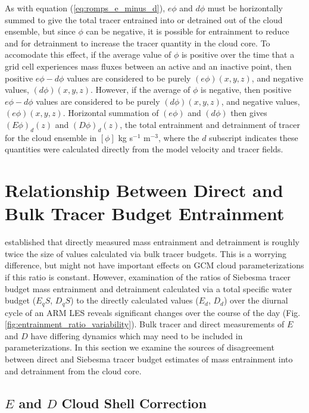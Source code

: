 \documentclass[12pt]{article}
\begin{document}
As with equation (\ref{eq:romps_e_minus_d}), $e\phi$ and $d\phi$ must be 
horizontally summed to give the total tracer entrained into or detrained out 
of the cloud ensemble, but since $\phi$ can be negative, it is possible for 
entrainment to reduce and for detrainment to increase the tracer quantity 
in the cloud core.  To accomodate this effect, if the average value of $\phi$ 
is positive over the time that a grid cell experiences mass fluxes between an 
active and an inactive point, then positive $e\phi-d\phi$ values are 
considered to be purely $(e\phi)(x,y,z)$, and negative values, $(d\phi)(x,y,z)$. 
However, if the average of $\phi$ is negative, then positive $e\phi-d\phi$ 
values are considered to be purely $(d\phi)(x,y,z)$, and negative values, 
$(e\phi)(x,y,z)$.  Horizontal summation of $(e\phi)$ and $(d\phi)$ then 
gives $(E\phi)_d(z)$ and $(D\phi)_d(z)$, the total entrainment and detrainment 
of tracer for the cloud ensemble in $[\phi]$ kg s$^{-1}$ m$^{-3}$, where the 
$d$ subscript indicates these quantities were calculated directly from the 
model velocity and tracer fields.


\section{Relationship Between Direct and Bulk Tracer Budget Entrainment}

\cite{Romps2010} established that directly measured mass entrainment and 
detrainment is roughly twice the size of values calculated via bulk 
tracer budgets.  This is a worrying difference, but might not have important
effects on GCM cloud parameterizations if this ratio is constant.  
However, examination of the ratios of Siebesma tracer budget mass entrainment 
and detrainment calculated via a total specific water budget ($E_qS$, $D_qS$) 
to the directly calculated values ($E_d$, $D_d$) over the diurnal cycle of an 
ARM LES reveals significant changes over the course of the day 
(Fig. \ref{fig:entrainment_ratio_variability}).  Bulk tracer and direct 
measurements of $E$ and $D$ have differing dynamics which may need to be 
included in parameterizations.  In this section we examine the sources of 
disagreement between direct and Siebesma tracer budget estimates of mass entrainment into and detrainment from the cloud core.


\subsection{$E$ and $D$ Cloud Shell Correction}
\end{document}
